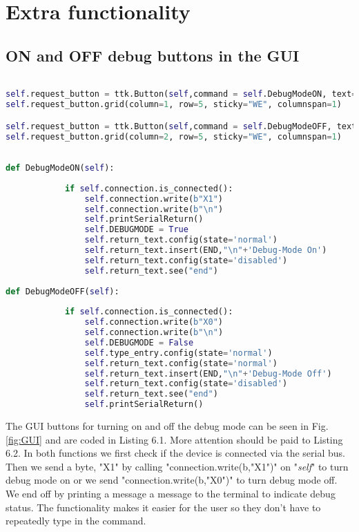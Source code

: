 \chapter{Extra functionality} \label{ch:Extra_functionality}


\section{ON and OFF debug buttons in the GUI}



\begin{lstlisting}[language=Python, caption=Debug On/Off  button setup]

self.request_button = ttk.Button(self,command = self.DebugModeON, text="Debug Mode ON")
self.request_button.grid(column=1, row=5, sticky="WE", columnspan=1)

self.request_button = ttk.Button(self,command = self.DebugModeOFF, text="Debug Mode OFF")
self.request_button.grid(column=2, row=5, sticky="WE", columnspan=1)

\end{lstlisting}


\begin{lstlisting}[language=Python, caption=Debug On/Off function setup]

def DebugModeON(self):
    
            if self.connection.is_connected():
                self.connection.write(b"X1")
                self.connection.write(b"\n")
                self.printSerialReturn()
                self.DEBUGMODE = True
                self.return_text.config(state='normal')
                self.return_text.insert(END,"\n"+'Debug-Mode On')
                self.return_text.config(state='disabled')
                self.return_text.see("end")
                
def DebugModeOFF(self):
    
            if self.connection.is_connected():
                self.connection.write(b"X0")
                self.connection.write(b"\n")
                self.DEBUGMODE = False
                self.type_entry.config(state='normal')
                self.return_text.config(state='normal')
                self.return_text.insert(END,"\n"+'Debug-Mode Off')
                self.return_text.config(state='disabled')
                self.return_text.see("end")
                self.printSerialReturn()

\end{lstlisting}

The GUI buttons for turning on and off the debug mode can be seen in Fig. \ref{fig:GUI} and are coded in Listing 6.1. More attention should be paid to Listing 6.2. In both functions we first check if the device is connected via the serial bus. Then we send a byte, "X1" by calling "connection.write(b,"X1")" on "\textit{self}" to turn debug mode on or we send "connection.write(b,"X0")" to turn debug mode off. We end off by printing a message a message to the terminal to indicate debug status. The functionality makes it easier for the user so they don't have to repeatedly type in the command.